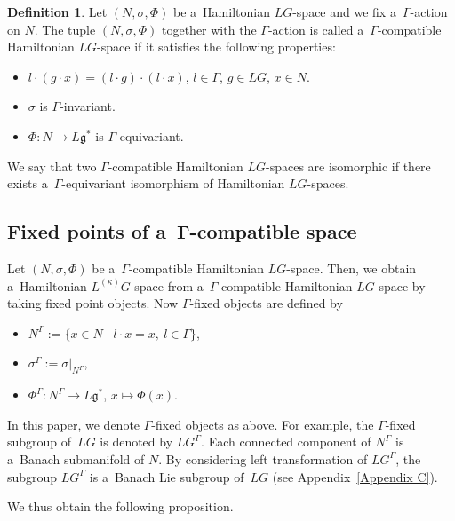 \documentclass[10pt,a4paper]{amsart}
\numberwithin{equation}{section}
\theoremstyle{definition}
\newtheorem{Definition}[Theorem]{Definition}
\begin{document}
\begin{Definition}
Let $(N,\sigma,\Phi)$ be a~Hamiltonian $LG$-space and we fix a~$\Gamma$-action on $N$.
 The tuple $(N,\sigma,\Phi)$ together with the $\Gamma$-action is called a~$\Gamma$-compatible Hamiltonian $LG$-space if it satisfies the following properties:
\begin{itemize}\itemsep=0pt
 \item[(1)] $l \cdot (g \cdot x) = (l \cdot g) \cdot (l \cdot x) $, $l \in \Gamma$, $ g \in LG$, $ x \in N$.
 \item[(2)] $\sigma$ is $\Gamma$-invariant.
 \item[(3)] $\Phi \colon N \to L\mathfrak{g}^*$ is $\Gamma$-equivariant.
 \end{itemize}

 We say that two $\Gamma$-compatible Hamiltonian $LG$-spaces are isomorphic
 if there exists a~$\Gamma$\nobreakdash-equi\-variant isomorphism of Hamiltonian $LG$-spaces.
\end{Definition}

\subsection[Fixed points of a Gamma-compatible space]{Fixed points of a~$\boldsymbol{\Gamma}$-compatible space}

Let $(N,\sigma,\Phi)$ be a~$\Gamma$-compatible Hamiltonian $LG$-space.
Then, we obtain a~Hamiltonian $L^{(\kappa)}G$-space from a~$\Gamma$-compatible Hamiltonian $LG$-space by taking fixed point objects.
Now $\Gamma$-fixed objects are defined by
\begin{itemize}\itemsep=0pt
 \item $N^{\Gamma} := \{x \in N \mid l \cdot x = x,\ l \in \Gamma\}$,
 \item $\sigma^{\Gamma} := \sigma|_{N^{\Gamma}}$,
 \item $\Phi ^{\Gamma} \colon N^{\Gamma} \to L\mathfrak{g}^{*}$, $x \mapsto \Phi(x)$.
\end{itemize}
In this paper, we denote $\Gamma$-fixed objects as above. For example, the $\Gamma$-fixed subgroup of~$LG$ is denoted by $LG^{\Gamma}$.
Each connected component of $N^{\Gamma}$ is a~Banach submanifold of $N$.
By considering left transformation of $LG^{\Gamma}$,
the subgroup $LG^{\Gamma}$ is a~Banach Lie subgroup of~$LG$ (see Appendix~\ref{Appendix C}).

We thus obtain the following proposition.
\end{document}
